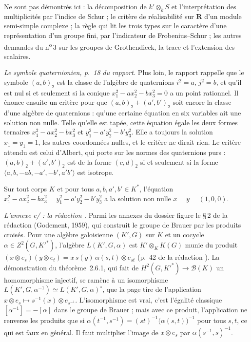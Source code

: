 Ne sont pas démontrés ici : la décomposition de $k' \otimes_k S$ et l'interprétation des multiplicités par l'indice de Schur ; le critère de réalisabilité sur $\mathbf R$ d'un module semi-simple complexe ; la règle qui lit les trois types sur le caractère d'une représentation d'un groupe fini, par l'indicateur de Frobenius--Schur ; les autres demandes du n\textsuperscript{o}\,3 sur les groupes de Grothendieck, la trace et l'extension des scalaires.

\emph{Le symbole quaternionien, p.~18 du rapport.} Plus loin, le rapport rappelle que le symbole $(a, b)_2$ est la classe de l'algèbre de quaternions $i^2 = a$, $j^2 = b$, et qu'il est nul si et seulement si la conique $x_1^2 - a x_2^2 - b x_3^2 = 0$ a un point rationnel. Il énonce ensuite un critère pour que $(a, b)_2 + (a', b')_2$ soit encore la classe d'une algèbre de quaternions : qu'une certaine équation en six variables ait une solution non nulle. Telle qu'elle est tapée, cette équation égale les deux formes ternaires $x_1^2 - a x_2^2 - b x_3^2$ et $y_1^2 - a' y_2^2 - b' y_3^2$. Elle a toujours la solution $x_1 = y_1 = 1$, les autres coordonnées nulles, et le critère ne dirait rien. Le critère attendu est celui d'Albert, qui porte sur les normes des quaternions purs : $(a,b)_2 + (a',b')_2$ est de la forme $(c, d)_2$ si et seulement si la forme $\langle a, b, -ab, -a', -b', a'b' \rangle$ est isotrope.

\begin{encadre}
\begin{contrexemple}
Sur tout corps $K$ et pour tous $a, b, a', b' \in K^*$, l'équation $x_1^2 - a x_2^2 - b x_3^2 = y_1^2 - a' y_2^2 - b' y_3^2$ a la solution non nulle $x = y = (1, 0, 0)$.
\end{contrexemple}
\end{encadre}

\emph{L'annexe c/ : la rédaction .} Parmi les annexes du dossier figure le §\,2 de la rédaction  (Godement, 1959), qui construit le groupe de Brauer par les produits croisés. Pour une algèbre galoisienne $(K', G)$ sur $K$ et un cocycle $\alpha \in Z^2(G, K'^*)$, l'algèbre $L(K', G, \alpha)$ est $K' \otimes_K K(G)$ munie du produit $(x \otimes e_s)(y \otimes e_t) = x\, s(y)\, \alpha(s, t) \otimes e_{st}$ (p.~42 de la rédaction ). La démonstration du théorème~2.6.1, qui fait de $H^2(G, K'^*) \to \mathscr B(K)$ un homomorphisme injectif, se ramène à un isomorphisme $L(K', G, \alpha^{-1}) \simeq L(K', G, \alpha)^{\circ}$, que la page tire de l'application $x \otimes e_s \mapsto s^{-1}(x) \otimes e_{s^{-1}}$. L'isomorphisme est vrai, c'est l'égalité classique $[\alpha^{-1}] = -[\alpha]$ dans le groupe de Brauer ; mais avec ce produit, l'application ne renverse les produits que si $\alpha(t^{-1}, s^{-1}) = (st)^{-1}\bigl(\alpha(s,t)\bigr)^{-1}$ pour tous $s, t$, ce qui est faux en général. Il faut multiplier l'image de $x \otimes e_s$ par $\alpha(s^{-1}, s)^{-1}$.

